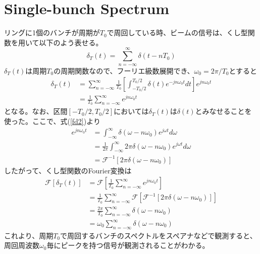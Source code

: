 \documentclass[]{jlreq}
\theoremstyle{definition}
\begin{document}
\section{Single-bunch Spectrum}
リングに1個のバンチが周期が$T_0$で周回している時、ビームの信号は、くし型関数を用いて以下のよう表せる。
%
\begin{equation}
  \delta_T (t) = \sum_{n=-\infty}^{\infty} \delta (t - n T_0 )
\end{equation}
%
$\delta_T (t)$は周期$T_0$の周期関数なので、フーリエ級数展開でき、$\omega_0 = 2\pi / T_0$とすると
%
\begin{align}
  \delta_T(t) &= \sum_{n = -\infty}^{\infty} \frac{1}{T_0} \left[\int_{-T_0/2}^{T_0/2}\delta (t) e^{-j n \omega_0 t} dt\right] 
  e^{j n \omega_0 t} \\
              &= \frac{1}{T_0} \sum_{n = -\infty}^{\infty} e^{j n \omega_0 t} 
\end{align}
%
となる。なお、区間$[-T_0/2, T_0/2]$においては$\delta_T(t)$は$\delta(t)$とみなせることを使った。ここで、式(\ref{fd2})より
%
\begin{align}
  e^{j n \omega_0 t} &=  \int_{-\infty}^{\infty} \delta (\omega - n \omega_0) e^{j \omega t} d\omega \\ 
      &= \frac{1}{2\pi} \int_{-\infty}^{\infty} 2\pi \delta (\omega - n \omega_0) e^{j \omega t} d\omega \\ 
      &= \mathcal{F}^{-1}[2\pi \delta(\omega - n\omega_0)] 
\end{align}
%
したがって、くし型関数のFourier変換は
%
\begin{align}
  \mathcal{F}[\delta_T(t)] &= \mathcal{F}\left[\frac{1}{T_0} \sum_{n = -\infty}^{\infty} e^{j n \omega_0 t}\right] \\ 
      & = \frac{1}{T_0} \sum_{n = -\infty}^{\infty} \mathcal{F}[\mathcal{F}^{-1}[2\pi \delta(\omega - n\omega_0)]] \\ 
      & = \frac{2 \pi}{T_0} \sum_{n = -\infty}^{\infty} \delta(\omega - n\omega_0)\\ 
      &= \omega_0 \sum_{n = -\infty}^{\infty} \delta(\omega - n\omega_0)
\end{align}
%
これより、周期$T_0$で周回するバンチのスペクトルをスペアナなどで観測すると、周回周波数$\omega_0$毎にピークを持つ信号が観測されることがわかる。
%
\end{document}
